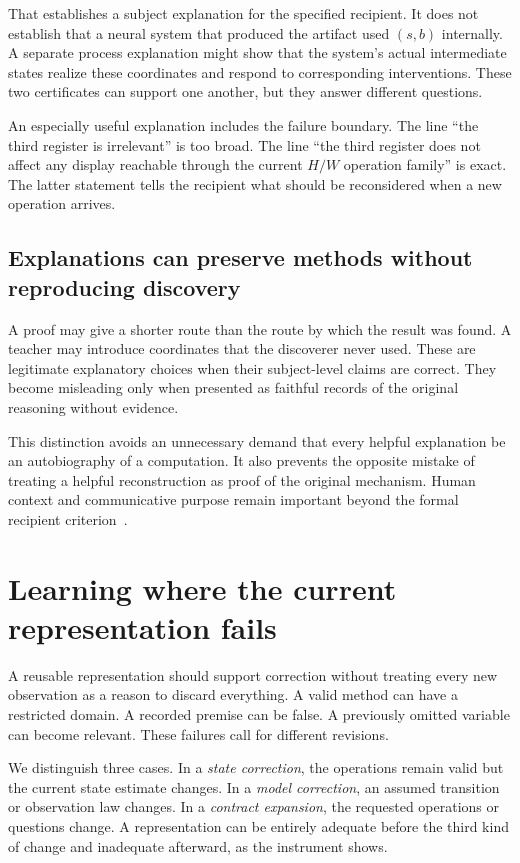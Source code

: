 \documentclass[11pt,letterpaper]{article}
\theoremstyle{plain}
\theoremstyle{definition}
\begin{document}
That establishes a subject explanation for the specified recipient. It does not establish that a neural system that produced the artifact used $(s,b)$ internally. A separate process explanation might show that the system's actual intermediate states realize these coordinates and respond to corresponding interventions. These two certificates can support one another, but they answer different questions.

An especially useful explanation includes the failure boundary. The line ``the third register is irrelevant'' is too broad. The line ``the third register does not affect any display reachable through the current $H/W$ operation family'' is exact. The latter statement tells the recipient what should be reconsidered when a new operation arrives.

\subsection{Explanations can preserve methods without reproducing discovery}
A proof may give a shorter route than the route by which the result was found. A teacher may introduce coordinates that the discoverer never used. These are legitimate explanatory choices when their subject-level claims are correct. They become misleading only when presented as faithful records of the original reasoning without evidence.

This distinction avoids an unnecessary demand that every helpful explanation be an autobiography of a computation. It also prevents the opposite mistake of treating a helpful reconstruction as proof of the original mechanism. Human context and communicative purpose remain important beyond the formal recipient criterion~\cite{miller}.

\section{Learning where the current representation fails}\label{sec:revision}
A reusable representation should support correction without treating every new observation as a reason to discard everything. A valid method can have a restricted domain. A recorded premise can be false. A previously omitted variable can become relevant. These failures call for different revisions.

We distinguish three cases. In a \emph{state correction}, the operations remain valid but the current state estimate changes. In a \emph{model correction}, an assumed transition or observation law changes. In a \emph{contract expansion}, the requested operations or questions change. A representation can be entirely adequate before the third kind of change and inadequate afterward, as the instrument shows.
\end{document}
